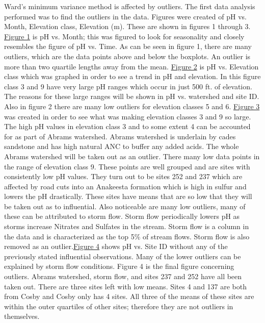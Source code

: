 \documentclass[11pt]{article} %
\begin{document}
Ward’s minimum variance method is affected by outliers.  The first data analysis performed was to find the outliers in the data.  Figures were created of pH vs. Month, Elevation class, Elevation (m).  These are shown in figures 1 through 3.  \hyperref[CAGraph1]{Figure 1} is pH vs. Month; this was figured to look for seasonality and closely resembles the figure of pH vs. Time.  As can be seen in figure 1, there are many outliers, which are the data points above and below the boxplots.  An outlier is more than two quartile lengths away from the mean.  \hyperref[CAGraph2]{Figure 2} is pH vs. Elevation class which was graphed in order to see a trend in pH and elevation.  In this figure class 3 and 9 have very large pH ranges which occur in just 500 ft. of elevation.  The reasons for these large ranges will be shown in pH vs. watershed and site ID.  Also in figure 2 there are many low outliers for elevation classes 5 and 6.  \hyperref[CAGraph3]{Figure 3} was created in order to see what was making elevation classes 3 and 9 so large.  The high pH values in elevation class 3 and to some extent 4 can be accounted for as part of Abrams watershed.  Abrams watershed is underlain by cades sandstone and has high natural ANC to buffer any added acids.  The whole Abrams watershed will be taken out as an outlier.  There many low data points in the range of elevation class 9.  These points are well grouped and are sites with consistently low pH values.  They turn out to be sites 252 and 237 which are affected by road cuts into an Anakeesta formation which is high in sulfur and  lowers the pH drastically.  These sites have means that are so low that they will be taken out as to influential.    Also noticeable are many low outliers, many of these can be attributed to storm flow.  Storm flow periodically lowers pH as storms increase Nitrates and Sulfates in the stream.  Storm flow is a column in the data and is characterized as the top 5$\%$ of stream flows.  Storm flow is also removed as an outlier.\hyperref[CAGraph6]{Figure 4} shows pH vs. Site ID without any of the previously stated influential observations.  Many of the lower outliers can be explained by storm flow conditions.  Figure 4 is the final figure concerning outliers.  Abrams watershed, storm flow, and sites 237 and 252 have all been taken out.  There are three sites left with low means.  Sites 4 and 137 are both from Cosby and Cosby only has 4 sites.  All three of the means of these sites are within the outer quartiles of other sites; therefore they are not outliers in themselves.
    
\end{document}

